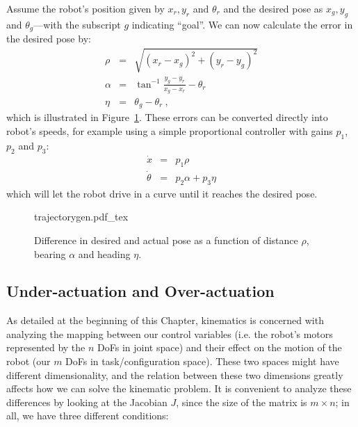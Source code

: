 Assume the robot's position given by $x_r, y_r$ and $\theta_r$ and the desired pose as $x_g, y_g$ and $\theta_g$---with the subscript $g$ indicating ``goal''.
We can now calculate the error in the desired pose by:
\begin{eqnarray}
\rho  &=& \sqrt{(x_r-x_g)^2+(y_r-y_g)^2} \nonumber \\
\alpha&=& \tan^{-1}{\frac{y_g-y_r}{x_g-x_r}}-\theta_r \\
\eta  &=& \theta_g-\theta_r\ , \nonumber
\end{eqnarray}
which is illustrated in Figure~\ref{fig:trajectorygen}.
These errors can be converted directly into robot's speeds, for example using a simple proportional controller with gains $p_1$, $p_2$ and $p_3$:
\begin{eqnarray}
\dot{x} &=& p_1 \rho\\
\dot{\theta} &=& p_2 \alpha + p_3 \eta
\end{eqnarray}
which will let the robot drive in a curve until it reaches the desired pose.

\begin{figure}
    \centering
    \def\svgwidth{\textwidth}
    {trajectorygen.pdf_tex}
    \caption{Difference in desired and actual pose as a function of distance $\rho$, bearing $\alpha$ and heading $\eta$.}
    \label{fig:trajectorygen}
\end{figure}


\subsection{Under-actuation and Over-actuation}\label{sec:kinematics:diff:underover}

As detailed at the beginning of this Chapter, kinematics is concerned with analyzing the mapping between our control variables (i.e. the robot's motors represented by the $n$ DoFs in joint space) and their effect on the motion of the robot (our $m$ DoFs in task/configuration space). These two spaces might have different dimensionality, and the relation between these two dimensions greatly affects how we can solve the kinematic problem. It is convenient to analyze these differences by looking at the Jacobian $J$, since the size of the matrix is $m \times n$; in all, we have three different conditions:

